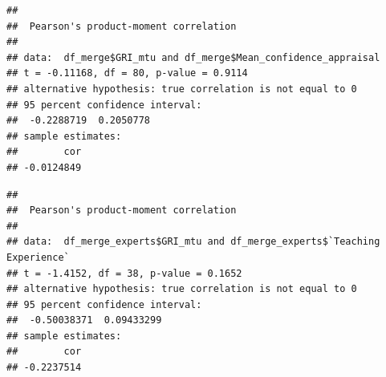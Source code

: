 \documentclass[
]{article}
\begin{document}
\begin{verbatim}
## 
##  Pearson's product-moment correlation
## 
## data:  df_merge$GRI_mtu and df_merge$Mean_confidence_appraisal
## t = -0.11168, df = 80, p-value = 0.9114
## alternative hypothesis: true correlation is not equal to 0
## 95 percent confidence interval:
##  -0.2288719  0.2050778
## sample estimates:
##        cor 
## -0.0124849
\end{verbatim}

\begin{verbatim}
## 
##  Pearson's product-moment correlation
## 
## data:  df_merge_experts$GRI_mtu and df_merge_experts$`Teaching Experience`
## t = -1.4152, df = 38, p-value = 0.1652
## alternative hypothesis: true correlation is not equal to 0
## 95 percent confidence interval:
##  -0.50038371  0.09433299
## sample estimates:
##        cor 
## -0.2237514
\end{verbatim}
\end{document}
